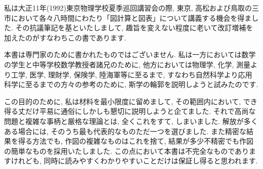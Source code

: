 私は大正11年(1992)東京物理学校夏季巡回講習会の際, 東京, 高松および鳥取の三市において各々八時間にわたり「図計算と図表」について講義する機会を得ました. その抗議筆記を基といたしまして, 趣旨を変えない程度に老いて改訂増補を加えたのがすなわちこの書であります.

本書は専門家のために書かれたものではございません. 私は一方においては数学の学生と中等学校数学教授者諸兄のために, 他方においては物理学, 化学, 測量より工学, 医学, 理財学, 保険学, 陸海軍等に至るまで, すなわち自然科学より応用科学に至るまでの方々の参考のために, 斯学の輪郭を説明しようと試みたのです.

この目的のために, 私は材料を最小限度に留めまして, その範囲内において, でき得る丈だけ平易に通俗にしかしも懇切に説明しようと企てました. それで高尚な問題と複雑な事柄と厳格な理論とは, 全くこれをすて, しまいました. 解放が多くある場合には, そのうち最も代表的なものただ一つを選びました. また精密な結果を得る方法でも, 作図の複雑なものはこれを捨て, 結果が多少不精密でも作図の簡単なものを採用いたしました. この点において本書は不完全なものでありますけれども, 同時に読みやすくわかりやすいことだけは保証し得ると思われます.
